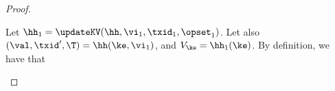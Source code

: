 \begin{proof}
\begin{itemize}
Let $\hh_1 = \updateKV(\hh, \vi_1, \txid_1, \opset_1)$. Let also $(\val, \txid', \T) = \hh(\ke, \vi_1)$, 
and $V_{\ke} = \hh_1(\ke)$. By definition, we have that 

\end{itemize}
\end{proof}

